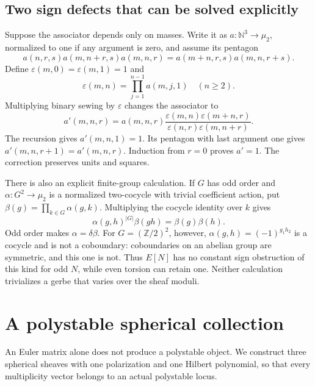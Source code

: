 \subsection{Two sign defects that can be solved explicitly}

Suppose the associator depends only on masses. Write it as
$a:\mathbb N^3\to\mu_2$, normalized to one if any argument
is zero, and assume its pentagon
\[
 a(n,r,s)a(m,n+r,s)a(m,n,r)
 =a(m+n,r,s)a(m,n,r+s).
\]
Define $\varepsilon(m,0)=\varepsilon(m,1)=1$ and
\begin{equation}\label{cycompact:eq:mass-correction}
 \varepsilon(m,n)=\prod_{j=1}^{n-1}a(m,j,1)\quad(n\geq2).
\end{equation}
Multiplying binary sewing by $\varepsilon$ changes the
associator to
\[
 a'(m,n,r)=a(m,n,r)
 \frac{\varepsilon(m,n)\varepsilon(m+n,r)}
      {\varepsilon(n,r)\varepsilon(m,n+r)}.
\]
The recursion gives $a'(m,n,1)=1$. Its pentagon with last
argument one gives $a'(m,n,r+1)=a'(m,n,r)$.
Induction from $r=0$ proves $a'=1$. The correction preserves
units and squares.

There is also an explicit finite-group calculation. If $G$
has odd order and $\alpha:G^2\to\mu_2$ is a normalized
two-cocycle with trivial coefficient action, put
$\beta(g)=\prod_{k\in G}\alpha(g,k)$.
Multiplying the cocycle identity over $k$ gives
\[
 \alpha(g,h)^{|G|}\beta(gh)=\beta(g)\beta(h).
\]
Odd order makes $\alpha=\delta\beta$.
For $G=(\mathbb Z/2)^2$, however,
$\alpha(g,h)=(-1)^{g_1h_2}$ is a cocycle and is not a
coboundary: coboundaries on an abelian group are symmetric,
and this one is not. Thus $E[N]$ has no constant sign
obstruction of this kind for odd $N$, while even torsion
can retain one. Neither calculation trivializes a gerbe
that varies over the sheaf moduli.

\section{A polystable spherical collection}
\label{cycompact:sec:polystable}

An Euler matrix alone does not produce a polystable object.
We construct three spherical sheaves with one polarization
and one Hilbert polynomial, so that every multiplicity vector
belongs to an actual polystable locus.

